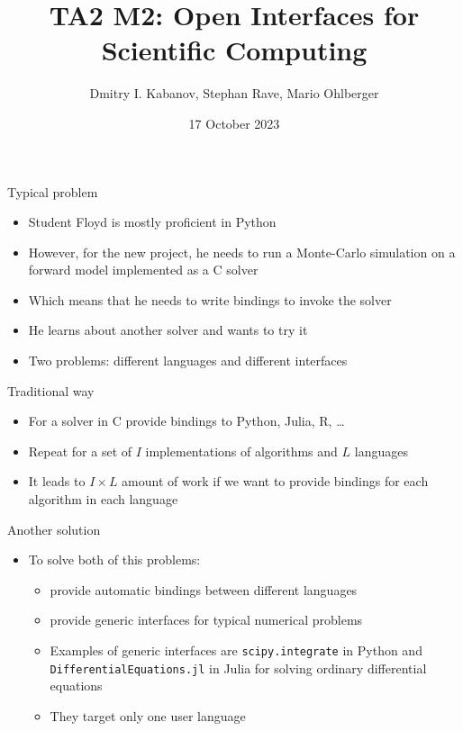 \documentclass[11pt, aspectratio=169]{beamer}
\title{TA2 M2: Open Interfaces for Scientific Computing}
\author{Dmitry I. Kabanov, Stephan Rave, Mario Ohlberger}
\institute{University of Münster}
\date{17 October 2023}
\begin{document}
\maketitle

\begin{frame}{Typical problem}
  \begin{itemize}
    \item Student Floyd is mostly proficient in Python
    \item However, for the new project, he needs to run a Monte-Carlo
          simulation on a forward model implemented as a C solver
    \item Which means that he needs to write bindings to invoke the solver
    \item He learns about another solver and wants to try it
    \item \alert{Two problems:} different languages and different interfaces
  \end{itemize}
\end{frame}

\begin{frame}{Traditional way}
  \begin{minipage}[0.45\textwidth]
    \begin{itemize}
      \item For a solver in C provide bindings to Python, Julia, R, \dots
      \item Repeat for a set of $I$ implementations of algorithms and $L$ languages
      \item It leads to $I \times L$ amount of work if we want to provide
            bindings for each algorithm in each language
    \end{itemize}
  \end{minipage}
  \begin{minipage}[0.45\textwidth]
    
  \end{minipage}

\end{frame}

\begin{frame}{Another solution}
  \begin{itemize}
    \item To solve both of this problems:
          \begin{itemize}
            \item provide automatic bindings between different languages
            \item provide generic interfaces for typical numerical problems
            \item Examples of generic interfaces are \texttt{scipy.integrate} in Python
                  and \texttt{DifferentialEquations.jl} in Julia for solving ordinary
                  differential equations
            \item They target only one user language
          \end{itemize}
  \end{itemize}
\end{frame}
\end{document}
